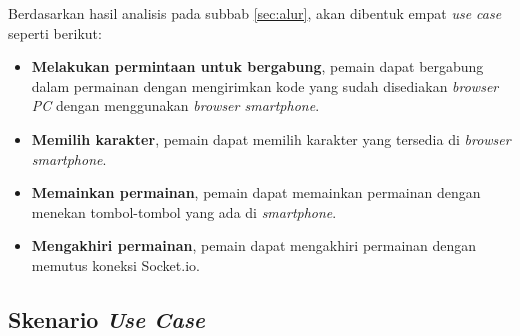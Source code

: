 Berdasarkan hasil analisis pada subbab \ref{sec:alur}, akan dibentuk empat \textit{use case} seperti berikut:

\begin{itemize}
	\item \textbf{Melakukan permintaan untuk bergabung}, pemain dapat bergabung dalam permainan dengan mengirimkan kode yang sudah disediakan \textit{browser PC} dengan menggunakan \textit{browser smartphone}.
	
	\item \textbf{Memilih karakter}, pemain dapat memilih karakter yang tersedia di \textit{browser smartphone}.
	
	\item \textbf{Memainkan permainan}, pemain dapat memainkan permainan dengan menekan tombol-tombol yang ada di \textit{smartphone}.
	
	\item \textbf{Mengakhiri permainan}, pemain dapat mengakhiri permainan dengan memutus koneksi Socket.io.
\end{itemize}

\subsection{Skenario \textit{Use Case}}

